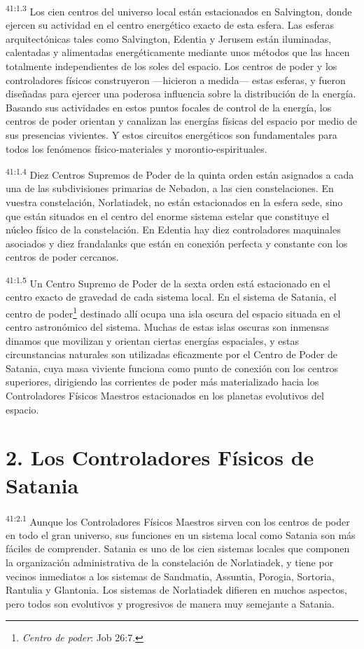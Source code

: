 \par
\textsuperscript{41:1.3} Los cien centros del universo local están estacionados en Salvington, donde ejercen su actividad en el centro energético exacto de esta esfera. Las esferas arquitectónicas tales como Salvington, Edentia y Jerusem están iluminadas, calentadas y alimentadas energéticamente mediante unos métodos que las hacen totalmente independientes de los soles del espacio. Los centros de poder y los controladores físicos construyeron ---hicieron a medida--- estas esferas, y fueron diseñadas para ejercer una poderosa influencia sobre la distribución de la energía. Basando sus actividades en estos puntos focales de control de la energía, los centros de poder orientan y canalizan las energías físicas del espacio por medio de sus presencias vivientes. Y estos circuitos energéticos son fundamentales para todos los fenómenos físico-materiales y morontio-espirituales.

\par
\textsuperscript{41:1.4} Diez Centros Supremos de Poder de la quinta orden están asignados a cada una de las subdivisiones primarias de Nebadon, a las cien constelaciones. En vuestra constelación, Norlatiadek, no están estacionados en la esfera sede, sino que están situados en el centro del enorme sistema estelar que constituye el núcleo físico de la constelación. En Edentia hay diez controladores maquinales asociados y diez frandalanks que están en conexión perfecta y constante con los centros de poder cercanos.

\par
\textsuperscript{41:1.5} Un Centro Supremo de Poder de la sexta orden está estacionado en el centro exacto de gravedad de cada sistema local. En el sistema de Satania, el centro de poder\footnote{\textit{Centro de poder}: Job 26:7.} destinado allí ocupa una isla oscura del espacio situada en el centro astronómico del sistema. Muchas de estas islas oscuras son inmensas dinamos que movilizan y orientan ciertas energías espaciales, y estas circunstancias naturales son utilizadas eficazmente por el Centro de Poder de Satania, cuya masa viviente funciona como punto de conexión con los centros superiores, dirigiendo las corrientes de poder más materializado hacia los Controladores Físicos Maestros estacionados en los planetas evolutivos del espacio.

\section*{2. Los Controladores Físicos de Satania}
\par
\textsuperscript{41:2.1} Aunque los Controladores Físicos Maestros sirven con los centros de poder en todo el gran universo, sus funciones en un sistema local como Satania son más fáciles de comprender. Satania es uno de los cien sistemas locales que componen la organización administrativa de la constelación de Norlatiadek, y tiene por vecinos inmediatos a los sistemas de Sandmatia, Assuntia, Porogia, Sortoria, Rantulia y Glantonia. Los sistemas de Norlatiadek difieren en muchos aspectos, pero todos son evolutivos y progresivos de manera muy semejante a Satania.

